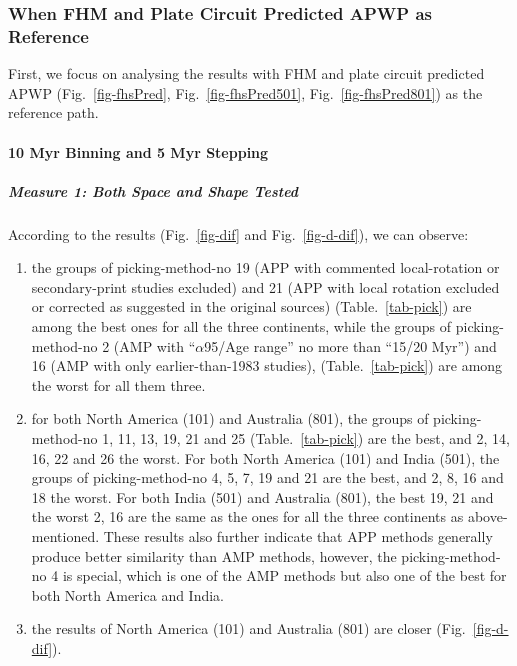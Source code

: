 \subsubsection{When FHM and Plate Circuit Predicted APWP as Reference}

First, we focus on analysing the results with FHM and plate circuit predicted
APWP (Fig.~\ref{fig-fhsPred}, Fig.~\ref{fig-fhsPred501},
Fig.~\ref{fig-fhsPred801}) as the reference path.

\paragraph{10 Myr Binning and 5 Myr Stepping}

\subparagraph{Measure 1: Both Space and Shape Tested}

According to the results (Fig.~\ref{fig-dif} and Fig.~\ref{fig-d-dif}), we can
observe:
%
\begin{enumerate}
  \item the groups of picking-method-no 19 (APP with commented local-rotation or
        secondary-print studies excluded) and 21 (APP with local rotation
        excluded or corrected as suggested in the original sources)
        (Table.~\ref{tab-pick}) are among the best ones for all the three
        continents, while the groups of picking-method-no 2 (AMP with
        ``$\alpha$95/Age range'' no more than ``15\degree/20 Myr'') and 16 (AMP
        with only earlier-than-1983 studies), (Table.~\ref{tab-pick}) are among
        the worst for all them three.
  \item for both North America (101) and Australia (801), the groups of
        picking-method-no 1, 11, 13, 19, 21 and 25 (Table.~\ref{tab-pick}) are
        the best, and 2, 14, 16, 22 and 26 the worst. For both North America
		(101) and India (501), the groups of picking-method-no 4, 5, 7, 19 and
		21 are the best, and 2, 8, 16 and 18 the worst. For both India (501)
		and Australia (801), the best 19, 21 and the worst 2, 16 are the same as
		the ones for all the three continents as above-mentioned. These results
		also further indicate that APP methods generally produce better
		similarity than AMP methods, however, the picking-method-no 4 is
		special, which is one of the AMP methods but also one of the best for
		both North America and India.
  \item the results of North America (101) and Australia (801) are closer
		(Fig.~\ref{fig-d-dif}).
\end{enumerate}


